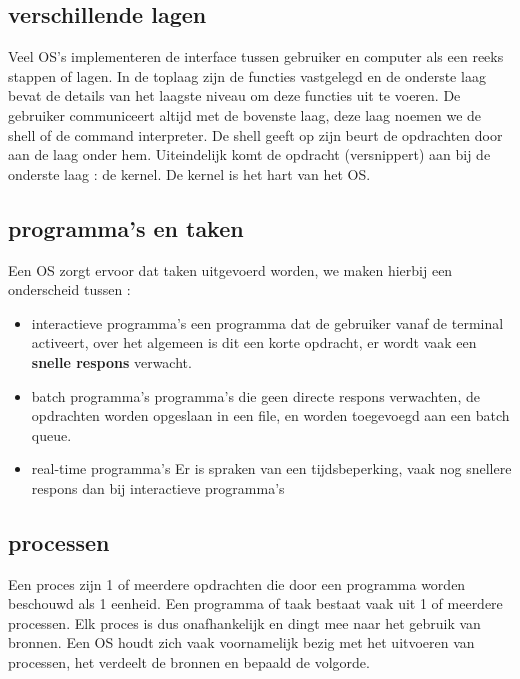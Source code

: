 \documentclass{report}
\begin{document}
  	 		\subsection{verschillende lagen}
  	 			Veel OS's implementeren de interface tussen gebruiker en computer als een reeks stappen of lagen. In de toplaag zijn de functies vastgelegd en de onderste laag bevat de details van het laagste niveau om deze functies uit te voeren. De gebruiker communiceert altijd met de bovenste laag, deze laag noemen we de shell of de command interpreter. De shell geeft op zijn beurt de opdrachten door aan de laag onder hem. Uiteindelijk komt de opdracht (versnippert) aan bij de onderste laag : de kernel. De kernel is het hart van het OS. 
  	 		\subsection{programma's en taken}
  	 			Een OS zorgt ervoor dat taken uitgevoerd worden, we maken hierbij een onderscheid tussen : 
  	 			\begin{itemize}
  	 				\item interactieve programma's
  	 					\subitem een programma dat de gebruiker vanaf de terminal activeert, over het algemeen is dit een korte opdracht, er wordt vaak een \textbf{snelle respons} verwacht.
  	 				\item batch programma's
  	 					\subitem programma's die geen directe respons verwachten, de opdrachten worden opgeslaan in een file, en worden toegevoegd aan een batch queue.
  	 				\item real-time programma's
  	 					\subitem Er is spraken van een tijdsbeperking, vaak nog snellere respons dan bij interactieve programma's
  	 			\end{itemize}
   			\subsection{processen}
   				Een proces zijn 1 of meerdere opdrachten die door een programma worden beschouwd als 1 eenheid. Een programma of taak bestaat vaak uit 1 of meerdere processen. Elk proces is dus onafhankelijk en dingt mee naar het gebruik van bronnen. Een OS houdt zich vaak voornamelijk bezig met het uitvoeren van processen, het verdeelt de bronnen en bepaald de volgorde.
\end{document}
